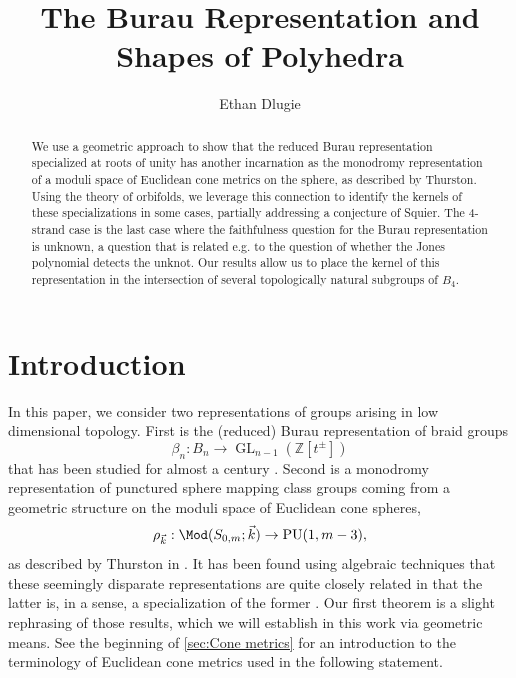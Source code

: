 \documentclass{amsart}
\title{The Burau Representation and Shapes of Polyhedra}
\author{Ethan Dlugie}
\date{}
\begin{document}
\begin{abstract}
    We use a geometric approach to show that the reduced Burau representation specialized at roots of unity has another incarnation as the monodromy representation of a moduli space of Euclidean cone metrics on the sphere, as described by Thurston. Using the theory of orbifolds, we leverage this connection to identify the kernels of these specializations in some cases, partially addressing a conjecture of Squier. The 4-strand case is the last case where the faithfulness question for the Burau representation is unknown, a question that is related e.g. to the question of whether the Jones polynomial detects the unknot. Our results allow us to place the kernel of this representation in the intersection of several topologically natural subgroups of $B_4$.
\end{abstract}

\maketitle
    
\section{Introduction}\label{sec:Introduction}
    In this paper, we consider two representations of groups arising in low dimensional topology. First is the (reduced) Burau representation of braid groups $$\beta_n:B_n \to \operatorname{GL}_{n-1}(\mathbb {Z}[t^\pm])$$ that has been studied for almost a century \cite{Burau1935UberVerkettungen}. Second is a monodromy representation of punctured sphere mapping class groups coming from a geometric structure on the moduli space of Euclidean cone spheres, $$\rho_{\vec k} : \Mod(S_{0,m};\vec k) \to \operatorname{PU}(1,m-3),$$ as described by Thurston in \cite{Thurston1998ShapesSphere}. It has been found using algebraic techniques that these seemingly disparate representations are quite closely related in that the latter is, in a sense, a specialization of the former \cite{McMullen2013BraidTheory,Venkataramana2014MonodromyLine}. Our first theorem is a slight rephrasing of those results, which we will establish in this work via geometric means. See the beginning of \cref{sec:Cone metrics} for an introduction to the terminology of Euclidean cone metrics used in the following statement.
    
\end{document}
